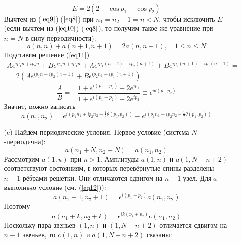 \documentclass[12pt]{article}
\begin{document}
\begin{enumerate}
\begin{itemize}
\begin{multline}
        \end{multline}
        \begin{equation}
            E=2(2-\cos p_1-\cos p_2)
        \end{equation}
        Вычтем из ($\ref{eq9}$) ($\ref{eq8}$) при $n_1=n_2-1=n<N$, чтобы исключить $E$ (если вычтем из ($\ref{eq10}$) ($\ref{eq8}$), то получим такое же уравнение при $n=N$ в силу периодичности): 
        \begin{equation}
            a(n,n)+a(n+1,n+1)=2a(n,n+1),\quad 1\leq n\leq N
        \end{equation}
        Подставим решение (\ref{eq11}):
        \begin{multline}
            Ae^{ip_1n+ip_2n}+Be^{ip_2n+ip_1n}+Ae^{ip_1(n+1)+ip_2(n+1)}+Be^{ip_2(n+1)+ip_1(n+1)}=\\
            =2(Ae^{ip_1n+ip_2(n+1)}+Be^{ip_2n_1+ip_1(n+1)})
        \end{multline}
        \begin{equation}
            \boxed{\frac{A}{B}=-\frac{1+e^{i(p_1+p_2)}-2e^{ip_1}}{1+e^{i(p_1+p_2)}-2e^{ip_2}}\equiv e^{i\theta(p_1,p_2)}}
        \end{equation}
        Значит, можно записать
        \begin{equation}\label{eq12}
            a(n_1,n_2)=e^{i(p_1n_1+ip_2n_2+\frac{1}{2}\theta(p_1,p_2))}-e^{i(p_1n_1+ip_2n_2-\frac{1}{2}\theta(p_1,p_2))}
        \end{equation}
        \item[(c)] Найдём периодические условия. Первое условие (система $N$-периодична):
        \begin{equation}
            \boxed{a(n_1+N,n_2+N)=a(n_1,n_2)}
        \end{equation}
        Рассмотрим $a(1,n)$ при $n>1$. Амплитуды $a(1,n)$ и $a(1,N-n+2)$ соответствуют состояниям, в которых перевёрнутые спины разделены $n-1$ рёбрами решётки. Они отличаются сдвигом на $n-1$ узел. Для $a$ выполнено условие (см. (\ref{eq12})):
        \begin{equation}
            a(n_1+1,n_2+1)=e^{i(p_1+p_2)}a(n_1,n_2)
        \end{equation}
        Поэтому
        \begin{equation}
            a(n_1+k,n_2+k)=e^{ik(p_1+p_2)}a(n_1,n_2)
        \end{equation}
        Поскольку пара звеньев $(1,n)$ и $(1,N-n+2)$ отличается сдвигом на $n-1$ звеньев, то $a(1,n)$ и $a(1,N-n+2)$ связаны:
        \begin{equation}

\end{equation}
\end{itemize}
\end{enumerate}
\end{document}
